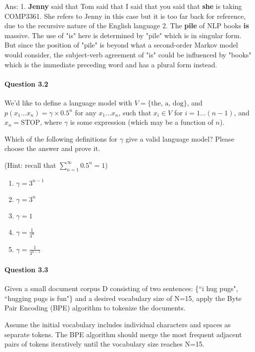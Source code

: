 \documentclass[10pt]{article}
\begin{document}
    Ans: 
            1. \textbf{Jenny} said that Tom said that I said that you said that \textbf{she} is taking COMP3361. 
            She refers to Jenny in this case but it is too far back for reference, due to the recursive nature of the       English language
            2. The \textbf{pile} of NLP books \textbf{is} massive.
            The use of "is" here is determined by "pile" which is in singular form. But since the position of "pile" is beyond what a second-order Markov model would consider, the subject-verb agreement of "is" could be influenced by "books" which is the immediate preceding word and has a plural form instead.


\newpage
\paragraph{Question 3.2}

We'd like to define a language model with \( V = \{\text{the, a, dog}\} \), and \( p(x_1 \ldots x_n) = \gamma \times 0.5^n \) for any \( x_1 \ldots x_n \), such that \( x_i \in V \) for \( i = 1 \ldots (n - 1) \), and \( x_n = \text{STOP} \), where \( \gamma \) is some expression (which may be a function of \( n \)).

Which of the following definitions for \( \gamma \) give a valid language model? Please choose the answer and prove it.

(Hint: recall that \( \sum_{n=1}^{\infty} 0.5^n = 1 \))

\begin{enumerate}
    \item \( \gamma = 3^{n-1} \)
    \item \( \gamma = 3^n \)
    \item \( \gamma = 1 \)
    \item \( \gamma = \frac{1}{3^n} \)
    \item \( \gamma = \frac{1}{3^{n-1}} \)
\end{enumerate}



\newpage
\paragraph{Question 3.3}
Given a small document corpus D consisting of two sentences: \{``i hug pugs", ``hugging pugs is fun"\} and a desired vocabulary size of N=15, apply the Byte Pair Encoding (BPE) algorithm to tokenize the documents.

Assume the initial vocabulary includes individual characters and spaces as separate tokens. The BPE algorithm should merge the most frequent adjacent pairs of tokens iteratively until the vocabulary size reaches N=15.
\end{document}
